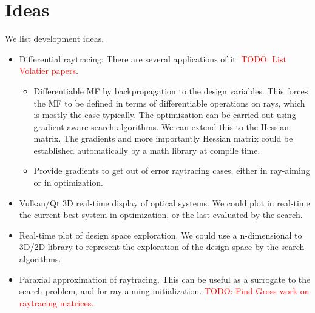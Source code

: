 \section{Ideas}
We list development ideas.

\begin{itemize}
\item Differential raytracing: There are several applications of it.
      \textcolor{red}{TODO: List Volatier papers}.
\begin{itemize}
  \item Differentiable MF by backpropagation to the design variables. This
        forces the MF to be defined in terms of differentiable operations on
        rays, which is mostly the case typically. The optimization can be
        carried out using gradient-aware search algorithms. We can extend this
        to the Hessian matrix. The gradients and more importantly Hessian matrix
        could be established automatically by a math library at compile time.
  \item Provide gradients to get out of error raytracing cases, either in
        ray-aiming or in optimization.
\end{itemize}
\item Vulkan/Qt 3D real-time display of optical systems. We could plot in
      real-time the current best system in optimization, or the last evaluated
      by the search.
\item Real-time plot of design space exploration. We could use a n-dimensional
      to 3D/2D library to represent the exploration of the design space by the
      search algorithms. 
\item Paraxial approximation of raytracing. This can be useful as a surrogate
      to the search problem, and for ray-aiming initialization.
      \textcolor{red}{TODO: Find Gross work on raytracing matrices.}
\end{itemize}

